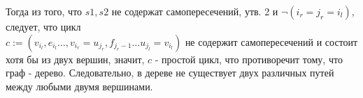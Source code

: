 \documentclass{article}
\begin{document}
    Тогда из того, что $s1, s2$ не содержат самопересечений, утв. 2 и $\neg(i_r = j_r = i_l)$, следует, что цикл\\
     $c := (v_{i_l},e_{i_l}\ldots, v_{i_r} = u_{j_r}, f_{j_r - 1} \ldots u_{j_l} = v_{i_l})$ не 
    содержит самопересечений и состоит хотя бы из двух вершин,
    значит, $c$ - простой цикл, что противоречит тому, что граф - дерево.
    Следовательно, в дереве не существует двух различных путей между любыми двумя вершинами.
\end{document}
